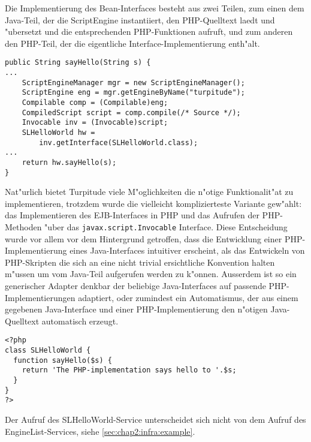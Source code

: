 Die Implementierung des Bean-Interfaces besteht aus zwei Teilen, zum einen dem Java-Teil, der die
ScriptEngine instantiiert, den PHP-Quelltext laedt und "ubersetzt und die entsprechenden PHP-Funktionen
aufruft, und zum anderen den PHP-Teil, der die eigentliche Interface-Implementierung enth"alt.
\begin{lstlisting}[caption=Java-Teil]
public String sayHello(String s) {
...
    ScriptEngineManager mgr = new ScriptEngineManager();
    ScriptEngine eng = mgr.getEngineByName("turpitude");
    Compilable comp = (Compilable)eng;
    CompiledScript script = comp.compile(/* Source */);
    Invocable inv = (Invocable)script;
    SLHelloWorld hw = 
        inv.getInterface(SLHelloWorld.class);
...
    return hw.sayHello(s);
}
\end{lstlisting}
Nat"urlich bietet Turpitude viele M"oglichkeiten die n"otige Funktionalit"at zu implementieren,
trotzdem wurde die vielleicht komplizierteste Variante gew"ahlt: das Implementieren des EJB-Interfaces in
PHP und das Aufrufen der PHP-Methoden "uber das \texttt{javax.script.Invocable} Interface. Diese Entscheidung 
wurde vor allem vor dem Hintergrund getroffen, dass die Entwicklung einer PHP-Implementierung eines Java-Interfaces
intuitiver erscheint, als das Entwickeln von PHP-Skripten die sich an eine nicht trivial ersichtliche
Konvention halten m"ussen um vom Java-Teil aufgerufen werden zu k"onnen. Ausserdem ist so ein 
generischer Adapter denkbar der beliebige Java-Interfaces auf passende PHP-Implementierungen adaptiert,
oder zumindest ein Automatismus, der aus einem gegebenen Java-Interface und einer PHP-Implementierung den 
n"otigen Java-Quelltext automatisch erzeugt.
\begin{lstlisting}[caption=PHP-Implementierung]
<?php
class SLHelloWorld {
  function sayHello($s) {
    return 'The PHP-implementation says hello to '.$s;
  }
}
?>
\end{lstlisting}
Der Aufruf des SLHelloWorld-Service unterscheidet sich nicht von dem Aufruf des EngineList-Services, siehe \ref{sec:chap2:infra:example}.

